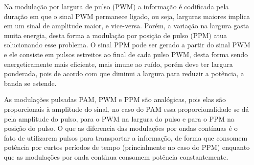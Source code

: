 \begin{subquestion}
    \item Na modulação por largura de pulso (PWM) a informação é codificada pela duração em que o sinal PWM permanece ligado, ou seja, larguras maiores implica em um sinal de amplitude maior, e vice-versa. Porém, a variação na largura gasta muita energia, desta forma a modulação por posição de pulso (PPM) atua solucionando esse problema. O sinal PPM pode ser gerado a partir do sinal PWM e ele consiste em pulsos estreitos ao final de cada pulso PWM, desta forma sendo energeticamente mais eficiente, mais imune ao ruído, porém deve ter largura ponderada, pois de acordo com que diminui a largura para reduzir a potência, a banda se estende.
    \item As modulações pulsadas PAM, PWM e PPM são analógicas, pois elas são proporcionais à amplitude do sinal, no caso do PAM essa proporcionalidade se dá pela amplitude do pulso, para o PWM na largura do pulso e para o PPM na posição do pulso. O que as diferencia das modulações por ondas contínuas é o fato de utilizarem pulsos para transportar a informação, de forma que consomem potência por curtos períodos de tempo (princialmente no caso do PPM) enquanto que as modulações por onda contínua consomem potência constantemente.
\end{subquestion}
